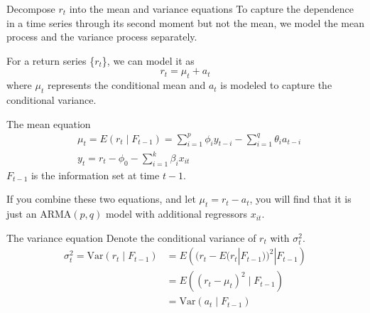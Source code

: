 \documentclass[presentation,10pt]{beamer}
\newcommand{\var}{\mathrm{Var}}
\begin{document}
\begin{frame}[label={sec:orgab1f730}]{Decompose \(r_t\) into the mean and variance equations}
To capture the dependence in a time series through its second moment
but not the mean, we model the mean process and the variance process
separately. 

For a return series \{\(r_t\)\}, we can model it as
\begin{equation}
\label{eq:mean-plus-var}
r_t = \mu_t + a_t
\end{equation}
where \(\mu_t\) represents the conditional mean and \(a_t\) is
modeled to capture the conditional variance.
\end{frame}

\begin{frame}[label={sec:orgeabf2f0}]{The mean equation}
\begin{align}
&\mu_t = E(r_t \mid F_{t-1}) = \sum_{i=1}^p \phi_i y_{t-i} - \sum_{i=1}^q \theta_i a_{t-i} \label{eq:mean-equation} \\
&y_t = r_t - \phi_0 - \sum_{i=1}^k \beta_i x_{it} \nonumber
\end{align}
\(F_{t-1}\) is the information set at time \(t-1\). 

\vspace{0.5cm}

If you combine these two equations, and let \(\mu_t = r_t - a_t\), you
will find that it is just an ARMA\((p, q)\) model with additional
regressors \(x_{it}\).
\end{frame}

\begin{frame}[label={sec:orgcec7b98}]{The variance equation}
Denote the conditional variance of \(r_t\) with \(\sigma^2_t\).
\begin{equation*}
\begin{split}
\sigma^2_t = \var(r_t \mid F_{t-1}) &= E\left( (r_t - E(r_t | F_{t-1}))^2 | F_{t-1} \right) \\
&= E\left( (r_t - \mu_t)^2 \mid F_{t-1} \right) \\
&= \var(a_t \mid F_{t-1})
\end{split}
\end{equation*}
\end{frame}
\end{document}
